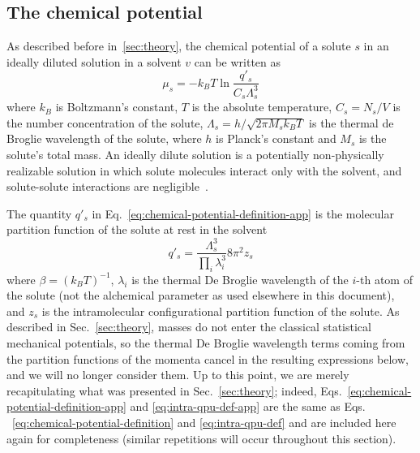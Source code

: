 \documentclass[9pt,bestpractices]{livecoms}
\begin{document}
\subsection{The chemical potential}
\label{sec:chemical_potential-app}

As described before in~\ref{sec:theory}, the chemical potential of a solute $s$ in an ideally diluted solution in a solvent $v$ can be written as~\cite{guggenheim1952mixtures504,gilson1997statisticalthermodynamic,gilson2007calculation}
\begin{equation}
  \mu_s = -k_B T \ln \frac{q'_s}{C_s \Lambda_s^3}
  \label{eq:chemical-potential-definition-app}
\end{equation}
where $k_B$ is Boltzmann's constant, $T$ is the absolute temperature, $C_s = N_s/V$ is the number concentration of the solute, $\Lambda_s = h/\sqrt{2 \pi M_s k_B T}$ is the thermal de Broglie wavelength of the solute, where $h$ is Planck's constant and $M_s$ is the solute's total mass. 
An ideally dilute solution is a potentially non-physically realizable solution in which solute molecules interact only with the solvent, and solute-solute interactions are negligible~\cite{levine2009physicalchemistrybook6ed}.

The quantity $q'_s$ in Eq.~\ref{eq:chemical-potential-definition-app} is the molecular partition function of the solute at rest in the solvent
\begin{equation}
  q'_s = \frac{\Lambda_s^3}{\prod_i \lambda_i^3} 8 \pi^2 z_s
  \label{eq:intra-qpu-def-app}
\end{equation}
where $\beta = (k_B T)^{-1}$, $\lambda_i$ is the thermal De Broglie wavelength of the $i$-th atom of the solute (not the alchemical parameter as used elsewhere in this document), and $z_s$ is the intramolecular configurational partition function of the solute.  As described in Sec.~\ref{sec:theory}, masses do not enter the classical statistical mechanical potentials, so the thermal De Broglie wavelength terms coming from the partition functions of the momenta cancel in the resulting expressions below, and we will no longer consider them.  Up to this point, we are merely recapitulating what was presented in Sec.~\ref{sec:theory}; indeed, Eqs.~\ref{eq:chemical-potential-definition-app} and \ref{eq:intra-qpu-def-app} are the same as Eqs. ~\ref{eq:chemical-potential-definition} and \ref{eq:intra-qpu-def} and are included here again for completeness (similar repetitions will occur throughout this section).
\end{document}
